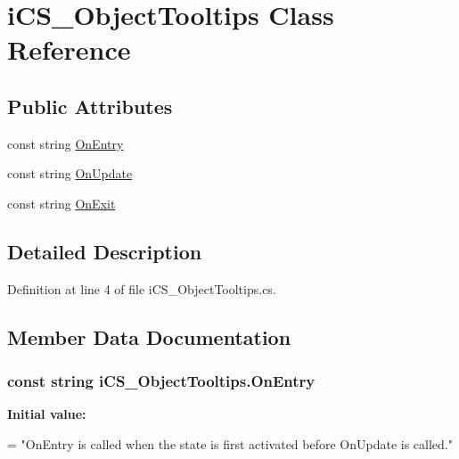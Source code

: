 \hypertarget{classi_c_s___object_tooltips}{\section{i\+C\+S\+\_\+\+Object\+Tooltips Class Reference}
\label{classi_c_s___object_tooltips}
}
\subsection*{Public Attributes}
\begin{DoxyCompactItemize}
\item 
const string \hyperlink{classi_c_s___object_tooltips_a474d38b793567853bcae34471f3a0c38}{On\+Entry}
\item 
const string \hyperlink{classi_c_s___object_tooltips_a3b8ebc7f81ce5b2e316c366f811cf462}{On\+Update}
\item 
const string \hyperlink{classi_c_s___object_tooltips_a6fdcf49adf08d56db7aa6463284e20bf}{On\+Exit}
\end{DoxyCompactItemize}


\subsection{Detailed Description}


Definition at line 4 of file i\+C\+S\+\_\+\+Object\+Tooltips.\+cs.



\subsection{Member Data Documentation}
\hypertarget{classi_c_s___object_tooltips_a474d38b793567853bcae34471f3a0c38}{
\subsubsection[{On\+Entry}]{\setlength{\rightskip}{0pt plus 5cm}const string i\+C\+S\+\_\+\+Object\+Tooltips.\+On\+Entry}}\label{classi_c_s___object_tooltips_a474d38b793567853bcae34471f3a0c38}
{\bfseries Initial value\+:}
\begin{DoxyCode}
=
        \textcolor{stringliteral}{"OnEntry is called when the state is first activated before OnUpdate is called."}
\end{DoxyCode}


